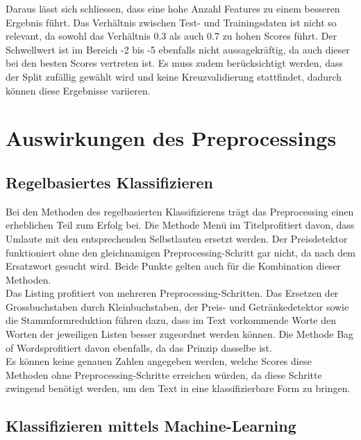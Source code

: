 Daraus lässt sich schliessen, dass eine hohe Anzahl Features zu einem besseren Ergebnis führt.
Das Verhältnis zwischen Test- und Trainingsdaten ist nicht so relevant, da sowohl das Verhältnis 0.3 als auch 0.7 zu hohen Scores führt.
Der Schwellwert ist im Bereich -2 bis -5 ebenfalls nicht aussagekräftig, da auch dieser bei den besten Scores vertreten ist.
Es muss zudem berücksichtigt werden, dass der Split zufällig gewählt wird und keine Kreuzvalidierung stattfindet, dadurch können diese Ergebnisse variieren.
\section{Auswirkungen des Preprocessings}
\subsection{Regelbasiertes Klassifizieren}
Bei den Methoden des regelbasierten Klassifizierens trägt das Preprocessing einen erheblichen Teil zum Erfolg bei.
Die Methode \glqq Menü im Titel\grqq profitiert davon, dass Umlaute mit den entsprechenden Selbstlauten ersetzt werden.
Der Preisdetektor funktioniert ohne den gleichnamigen Preprocessing-Schritt gar nicht, da nach dem Ersatzwort gesucht wird.
Beide Punkte gelten auch für die Kombination dieser Methoden.\\
Das Listing profitiert von mehreren Preprocessing-Schritten.
Das Ersetzen der Grossbuchstaben durch Kleinbuchstaben, der Preis- und Getränkedetektor sowie die Stammformreduktion führen dazu, dass im Text vorkommende Worte den Worten der jeweiligen Listen besser zugeordnet werden können.
Die Methode \glqq Bag of Words\grqq profitiert davon ebenfalls, da das Prinzip dasselbe ist.\\
Es können keine genauen Zahlen angegeben werden, welche Scores diese Methoden ohne Preprocessing-Schritte erreichen würden, da diese Schritte zwingend benötigt werden, um den Text in eine klassifizierbare Form zu bringen.
\subsection{Klassifizieren mittels Machine-Learning}

